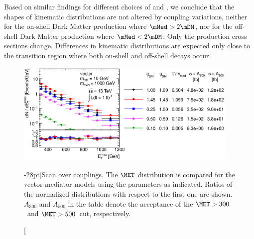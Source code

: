 Based on similar findings for different choices of
\mMed and \mDM, we conclude that the shapes of
kinematic distributions are not altered
by coupling variations, neither for the on-shell Dark Matter production where $\mMed>2\mDM$,
nor for the off-shell Dark Matter production where $\mMed<2\mDM$. Only the production cross sections change.
Differences in kinematic distributions are expected only close to the transition region where both on-shell and off-shell decays occur.
\begin{figure}
\centering
\includegraphics[width=0.95\textwidth]{figures/monojet/scan_g_V_10_1000.eps}
\caption[][-28pt]{Scan over couplings. The $\MET$ distribution is compared for the vector mediator models using the parameters as indicated. Ratios of the normalized distributions with respect to the first one are shown. $A_{300}$ and $A_{500}$ in the table denote the acceptance of the $\MET>300$~\gev and $\MET>500$~\gev cut, respectively.}
\label{fig:monojet_scan_V_g}
\end{figure}



